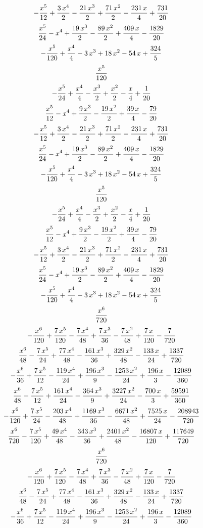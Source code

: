 $$-{{x^5}\over{12}}+{{3\,x^4}\over{2}}-{{21\,x^3}\over{2}}+{{71\,x^2
 }\over{2}}-{{231\,x}\over{4}}+{{731}\over{20}}$$
$${{x^5}\over{24}}-x^4+{{19\,x^3}\over{2}}-{{89\,x^2}\over{2}}+{{409
 \,x}\over{4}}-{{1829}\over{20}}$$
$$-{{x^5}\over{120}}+{{x^4}\over{4}}-3\,x^3+18\,x^2-54\,x+{{324
 }\over{5}}$$
$${{x^5}\over{120}}$$
$$-{{x^5}\over{24}}+{{x^4}\over{4}}-{{x^3}\over{2}}+{{x^2}\over{2}}-
 {{x}\over{4}}+{{1}\over{20}}$$
$${{x^5}\over{12}}-x^4+{{9\,x^3}\over{2}}-{{19\,x^2}\over{2}}+{{39\,x
 }\over{4}}-{{79}\over{20}}$$
$$-{{x^5}\over{12}}+{{3\,x^4}\over{2}}-{{21\,x^3}\over{2}}+{{71\,x^2
 }\over{2}}-{{231\,x}\over{4}}+{{731}\over{20}}$$
$${{x^5}\over{24}}-x^4+{{19\,x^3}\over{2}}-{{89\,x^2}\over{2}}+{{409
 \,x}\over{4}}-{{1829}\over{20}}$$
$$-{{x^5}\over{120}}+{{x^4}\over{4}}-3\,x^3+18\,x^2-54\,x+{{324
 }\over{5}}$$
$${{x^5}\over{120}}$$
$$-{{x^5}\over{24}}+{{x^4}\over{4}}-{{x^3}\over{2}}+{{x^2}\over{2}}-
 {{x}\over{4}}+{{1}\over{20}}$$
$${{x^5}\over{12}}-x^4+{{9\,x^3}\over{2}}-{{19\,x^2}\over{2}}+{{39\,x
 }\over{4}}-{{79}\over{20}}$$
$$-{{x^5}\over{12}}+{{3\,x^4}\over{2}}-{{21\,x^3}\over{2}}+{{71\,x^2
 }\over{2}}-{{231\,x}\over{4}}+{{731}\over{20}}$$
$${{x^5}\over{24}}-x^4+{{19\,x^3}\over{2}}-{{89\,x^2}\over{2}}+{{409
 \,x}\over{4}}-{{1829}\over{20}}$$
$$-{{x^5}\over{120}}+{{x^4}\over{4}}-3\,x^3+18\,x^2-54\,x+{{324
 }\over{5}}$$
$${{x^6}\over{720}}$$
$$-{{x^6}\over{120}}+{{7\,x^5}\over{120}}-{{7\,x^4}\over{48}}+{{7\,x^
 3}\over{36}}-{{7\,x^2}\over{48}}+{{7\,x}\over{120}}-{{7}\over{720}}$$
$${{x^6}\over{48}}-{{7\,x^5}\over{24}}+{{77\,x^4}\over{48}}-{{161\,x^
 3}\over{36}}+{{329\,x^2}\over{48}}-{{133\,x}\over{24}}+{{1337}\over{
 720}}$$
$$-{{x^6}\over{36}}+{{7\,x^5}\over{12}}-{{119\,x^4}\over{24}}+{{196\,
 x^3}\over{9}}-{{1253\,x^2}\over{24}}+{{196\,x}\over{3}}-{{12089
 }\over{360}}$$
$${{x^6}\over{48}}-{{7\,x^5}\over{12}}+{{161\,x^4}\over{24}}-{{364\,x
 ^3}\over{9}}+{{3227\,x^2}\over{24}}-{{700\,x}\over{3}}+{{59591
 }\over{360}}$$
$$-{{x^6}\over{120}}+{{7\,x^5}\over{24}}-{{203\,x^4}\over{48}}+{{1169
 \,x^3}\over{36}}-{{6671\,x^2}\over{48}}+{{7525\,x}\over{24}}-{{
 208943}\over{720}}$$
$${{x^6}\over{720}}-{{7\,x^5}\over{120}}+{{49\,x^4}\over{48}}-{{343\,
 x^3}\over{36}}+{{2401\,x^2}\over{48}}-{{16807\,x}\over{120}}+{{
 117649}\over{720}}$$
$${{x^6}\over{720}}$$
$$-{{x^6}\over{120}}+{{7\,x^5}\over{120}}-{{7\,x^4}\over{48}}+{{7\,x^
 3}\over{36}}-{{7\,x^2}\over{48}}+{{7\,x}\over{120}}-{{7}\over{720}}$$
$${{x^6}\over{48}}-{{7\,x^5}\over{24}}+{{77\,x^4}\over{48}}-{{161\,x^
 3}\over{36}}+{{329\,x^2}\over{48}}-{{133\,x}\over{24}}+{{1337}\over{
 720}}$$
$$-{{x^6}\over{36}}+{{7\,x^5}\over{12}}-{{119\,x^4}\over{24}}+{{196\,
 x^3}\over{9}}-{{1253\,x^2}\over{24}}+{{196\,x}\over{3}}-{{12089
 }\over{360}}$$
